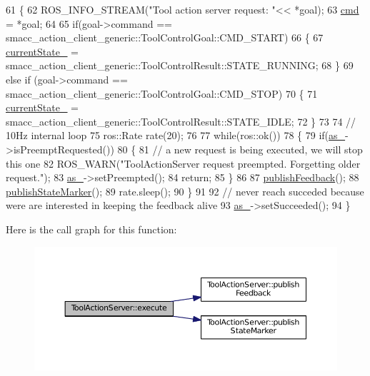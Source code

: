\begin{DoxyCode}
61 \{
62   ROS\_INFO\_STREAM(\textcolor{stringliteral}{"Tool action server request: "}<< *goal);
63   \hyperlink{classToolActionServer_ad2320c18b9cf85de44f77e9815368902}{cmd} = *goal;
64 
65   \textcolor{keywordflow}{if}(goal->command == smacc\_action\_client\_generic::ToolControlGoal::CMD\_START)
66   \{
67     \hyperlink{classToolActionServer_aac4862d8c313b07e8506eb0c74507fb1}{currentState\_} =  smacc\_action\_client\_generic::ToolControlResult::STATE\_RUNNING;
68   \}
69   \textcolor{keywordflow}{else}  \textcolor{keywordflow}{if} (goal->command == smacc\_action\_client\_generic::ToolControlGoal::CMD\_STOP)
70   \{
71     \hyperlink{classToolActionServer_aac4862d8c313b07e8506eb0c74507fb1}{currentState\_} =  smacc\_action\_client\_generic::ToolControlResult::STATE\_IDLE;
72   \}
73 
74   \textcolor{comment}{// 10Hz internal loop}
75   ros::Rate rate(20);
76 
77   \textcolor{keywordflow}{while}(ros::ok())
78   \{
79     \textcolor{keywordflow}{if}(\hyperlink{classToolActionServer_abeb62e08e08d40e6a65b199c86da6d69}{as\_}->isPreemptRequested())
80     \{
81        \textcolor{comment}{// a new request is being executed, we will stop this one}
82        ROS\_WARN(\textcolor{stringliteral}{"ToolActionServer request preempted. Forgetting older request."});
83        \hyperlink{classToolActionServer_abeb62e08e08d40e6a65b199c86da6d69}{as\_}->setPreempted(); 
84        \textcolor{keywordflow}{return};
85     \}
86     
87     \hyperlink{classToolActionServer_afe566312095ca250bc32f98a11774f2b}{publishFeedback}();
88     \hyperlink{classToolActionServer_aef01c70e358c933855db3a37b46a3740}{publishStateMarker}();
89     rate.sleep();
90   \}
91 
92    \textcolor{comment}{// never reach succeded because were are interested in keeping the feedback alive}
93    \hyperlink{classToolActionServer_abeb62e08e08d40e6a65b199c86da6d69}{as\_}->setSucceeded();
94 \}
\end{DoxyCode}


Here is the call graph for this function\+:
\nopagebreak
\begin{figure}[H]
\begin{center}
\leavevmode
\includegraphics[width=350pt]{classToolActionServer_a34bd6fce77510778d5a51385afeb36bb_cgraph}
\end{center}
\end{figure}



